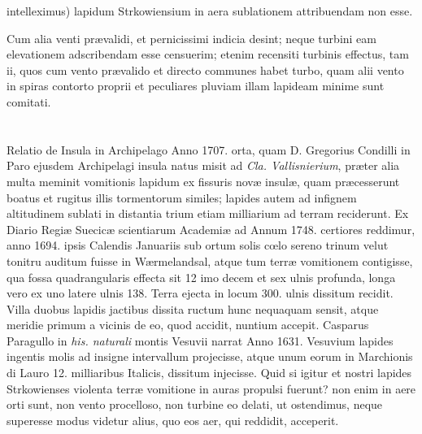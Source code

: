 \documentclass[a4paper, 11pt, oneside, polutonikogreek, latin]{article}
\begin{document}
intelleximus) lapidum Strkowiensium in aera sublationem attribuendam non esse.

Cum alia venti prævalidi, et pernicissimi indicia desint; neque turbini eam elevationem adscribendam esse censuerim; etenim recensiti turbinis effectus, tam ii, quos cum vento prævalido et directo communes habet turbo, quam alii vento in spiras contorto proprii et peculiares pluviam illam lapideam minime sunt comitati.
\clearpage
\section[Lapides Strkowienses videntur ructus quodam terrae, et vomitione in auras ejecti, inde rursum decidisse.]{}
\paragraph{}
Relatio de Insula in Archipelago Anno 1707. orta, quam D. Gregorius Condilli in Paro ejusdem Archipelagi insula natus misit ad \emph{Cla. Vallisnierium}, præter alia multa meminit vomitionis lapidum ex fissuris novæ insulæ, quam præcesserunt boatus et rugitus illis tormentorum similes; lapides autem ad infignem altitudinem sublati in distantia trium etiam milliarium ad terram reciderunt. Ex Diario Regiæ Suecicæ scientiarum Academiæ ad Annum 1748. certiores reddimur, anno 1694. ipsis Calendis Januariis sub ortum solis cœlo sereno trinum velut tonitru auditum fuisse in Wærmelandsal, atque tum terræ vomitionem contigisse, qua fossa quadrangularis effecta sit 12 imo decem et sex ulnis profunda, longa vero ex uno latere ulnis 138. Terra ejecta in locum 300. ulnis dissitum recidit. Villa duobus lapidis jactibus dissita ructum hunc nequaquam sensit, atque meridie primum a vicinis de eo, quod accidit, nuntium accepit. Casparus Paragullo in \emph{his. naturali} montis Vesuvii narrat Anno 1631. Vesuvium lapides ingentis molis ad insigne intervallum projecisse, atque unum eorum in Marchionis di Lauro 12. milliaribus Italicis, dissitum injecisse. Quid si igitur et nostri lapides Strkowienses violenta terræ vomitione in auras propulsi fuerunt? non enim in aere orti sunt, non vento procelloso, non turbine eo delati, ut ostendimus, neque superesse modus videtur alius, quo eos aer, qui reddidit, acceperit.
\end{document}
